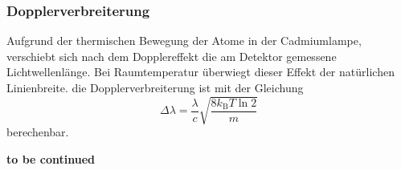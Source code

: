 \subsubsection{Dopplerverbreiterung}
Aufgrund der thermischen Bewegung der Atome in der Cadmiumlampe, verschiebt sich 
nach dem Dopplereffekt die am Detektor gemessene Lichtwellenlänge. Bei Raumtemperatur
überwiegt dieser Effekt der natürlichen Linienbreite. die Dopplerverbreiterung
ist mit der Gleichung 
\begin{equation*}
    \Delta\lambda = \frac{\lambda}{c}\sqrt{\frac{8k_\mathrm BT\ln 2}{m}}
\end{equation*}
berechenbar. 

\textbf{to be continued}
